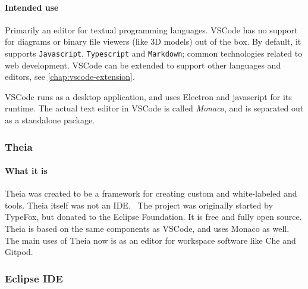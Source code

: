\paragraph*{Intended use} Primarily an editor for textual programming languages.
VSCode has no support for diagrams or binary file viewers (like 3D models) out of the box. By default, it supports \texttt{Javascript}, \texttt{Typescript} and \texttt{Markdown}; common technologies related to web development.
VSCode can be extended to support other languages and editors, see \cref{chap:vscode-extension}.

VSCode runs as a desktop application, and uses Electron and javascript for its runtime.
The actual text editor in \gls{VSCode} is called \emph{Monaco}, and is separated out as a standalone package.


\subsubsection{Theia}\label{sec:theia}

\paragraph*{What it is}
\Gls{Theia} was created to be a framework for creating custom and
white-labeled  and tools. Theia itself was not an IDE.~\cite{helmingEclipseTheiaIDE2019}
The project was originally started by TypeFox, but donated to the Eclipse Foundation.
It is free and fully \gls{open source}.
\Gls{Theia} is based on the same components as \gls{VSCode}, and uses Monaco as well.
The main uses of Theia now is as an editor for workspace software like \gls{Che} and \gls{Gitpod}.


\subsubsection{Eclipse IDE}
